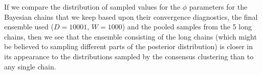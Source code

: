 \documentclass[]{article}
\begin{document}

If we compare the distribution of sampled values for the $\phi$ parameters for the Bayesian chains that we keep based upon their convergence diagnostics, the final ensemble used ($D=10001$, $W=1000$) and the pooled samples from the 5 long chains, then we see that the ensemble consisting of the long chains (which might be believed to sampling different parts of the posterior distribution) is closer in its appearance to the distributions sampled by the consensus clustering than to any single chain. 


\end{document}
